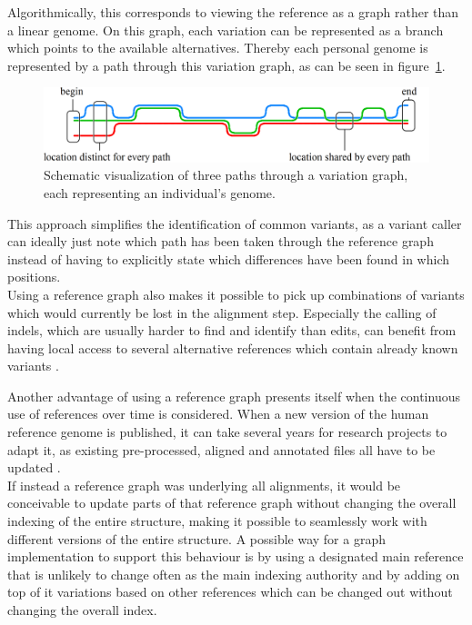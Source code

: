 \documentclass[a4paper,12pt,twoside,BCOR=10mm]{scrbook}
\begin{document}
Algorithmically, this corresponds to viewing the reference as a graph rather than a linear genome.
On this graph, each variation can be represented as a branch which points to the available alternatives.
Thereby each personal genome is represented by a path through this variation graph,
as can be seen in figure~\ref{fig:evo_intro_three_ref_seq_align}. \\
\begin{figure}[!htb]
\centering
\includegraphics[width=\textwidth]{evo_intro_three_ref_seq_align.png}
\caption[Schematic visualization of three paths through a variation graph]{Schematic visualization of three paths through a variation graph, each representing an individual's genome.} \label{fig:evo_intro_three_ref_seq_align}
\end{figure}
This approach simplifies the identification of common variants, as a variant caller can
ideally just note which path has been taken through the reference graph instead of having to
explicitly state which differences have been found in which positions. \\
Using a reference graph also makes it possible to pick up combinations of variants
which would currently be lost in the alignment step.
Especially the calling of indels, which are usually harder to find and identify than edits,
can benefit from having local access to several alternative references which contain
already known variants \citep{Albers2010}.

Another advantage of using a reference graph presents itself when the continuous use of
references over time is considered.
When a new version of the human reference genome is published,
it can take several years for research projects to adapt it,
as existing pre-processed, aligned and annotated files all have to be updated \citep{RedditSwitchTo38}. \\
If instead a reference graph was underlying all alignments, it would be conceivable
to update parts of that reference graph without changing the overall indexing of the entire structure,
making it possible to seamlessly work with different versions of the entire structure.
A possible way for a graph implementation to support this behaviour is by using a designated main
reference that is unlikely to change often as the main indexing authority and by adding on top of it
variations based on other references which can be changed out without changing the overall index.
\end{document}
